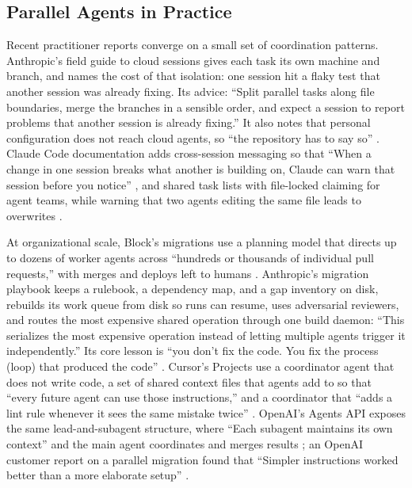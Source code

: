 \documentclass[11pt]{article}
\begin{document}
\subsection{Parallel Agents in Practice}
Recent practitioner reports converge on a small set of coordination patterns. Anthropic's field guide to cloud sessions gives each task its own machine and branch, and names the cost of that isolation: one session hit a flaky test that another session was already fixing. Its advice: ``Split parallel tasks along file boundaries, merge the branches in a sensible order, and expect a session to report problems that another session is already fixing.'' It also notes that personal configuration does not reach cloud agents, so ``the repository has to say so'' \cite{osmani2026cloud}. Claude Code documentation adds cross-session messaging so that ``When a change in one session breaks what another is building on, Claude can warn that session before you notice'' \cite{anthropic2026crosssession}, and shared task lists with file-locked claiming for agent teams, while warning that two agents editing the same file leads to overwrites \cite{anthropic2026agentteams}.

At organizational scale, Block's migrations use a planning model that directs up to dozens of worker agents across ``hundreds or thousands of individual pull requests,'' with merges and deploys left to humans \cite{anthropic2026block}. Anthropic's migration playbook keeps a rulebook, a dependency map, and a gap inventory on disk, rebuilds its work queue from disk so runs can resume, uses adversarial reviewers, and routes the most expensive shared operation through one build daemon: ``This serializes the most expensive operation instead of letting multiple agents trigger it independently.'' Its core lesson is ``you don't fix the code. You fix the process (loop) that produced the code'' \cite{anthropic2026migrations}. Cursor's Projects use a coordinator agent that does not write code, a set of shared context files that agents add to so that ``every future agent can use those instructions,'' and a coordinator that ``adds a lint rule whenever it sees the same mistake twice'' \cite{cursor2026projects}. OpenAI's Agents API exposes the same lead-and-subagent structure, where ``Each subagent maintains its own context'' and the main agent coordinates and merges results \cite{openai2026agentsapi}; an OpenAI customer report on a parallel migration found that ``Simpler instructions worked better than a more elaborate setup'' \cite{openai2026asana}.
\end{document}

